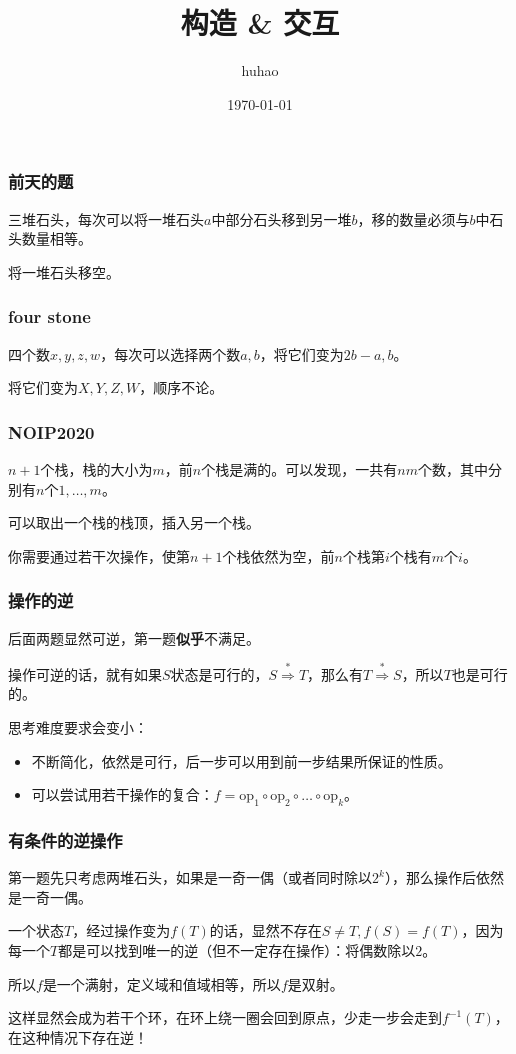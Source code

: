 \documentclass[10pt]{beamer}
\begin{document}
	\title{构造 \& 交互}
	\date{\today}
	\author{huhao}
	\maketitle
	\clearpage
	\begin{frame}
		\frametitle{前天的题}
	
		三堆石头，每次可以将一堆石头$a$中部分石头移到另一堆$b$，移的数量必须与$b$中石头数量相等。

		将一堆石头移空。
	
	\end{frame}
	\clearpage
	\begin{frame}
		\frametitle{four stone}
	
		四个数$x,y,z,w$，每次可以选择两个数$a,b$，将它们变为$2b-a,b$。

		将它们变为$X,Y,Z,W$，顺序不论。
	
	\end{frame}
	\clearpage
	\begin{frame}
		\frametitle{NOIP2020}
	
		$n+1$个栈，栈的大小为$m$，前$n$个栈是满的。可以发现，一共有$nm$个数，其中分别有$n$个$1,\dots,m$。

		可以取出一个栈的栈顶，插入另一个栈。

		你需要通过若干次操作，使第$n+1$个栈依然为空，前$n$个栈第$i$个栈有$m$个$i$。
	
	\end{frame}
	\clearpage
	\begin{frame}
		\frametitle{操作的逆}
	
		后面两题显然可逆，第一题\textbf{似乎}不满足。

		操作可逆的话，就有如果$S$状态是可行的，$S\stackrel*\Rightarrow T$，那么有$T\stackrel*\Rightarrow S$，所以$T$也是可行的。


		思考难度要求会变小：
		
		\begin{itemize}
			\item 不断简化，依然是可行，后一步可以用到前一步结果所保证的性质。
			\item 可以尝试用若干操作的复合：$f=\mathrm{op}_1 \circ \mathrm{op}_2 \circ \dots \circ  \mathrm{op}_k$。
		\end{itemize}
	\end{frame}
	\clearpage
	\begin{frame}
		\frametitle{有条件的逆操作}
	
		第一题先只考虑两堆石头，如果是一奇一偶（或者同时除以$2^k$），那么操作后依然是一奇一偶。

		一个状态$T$，经过操作变为$f(T)$的话，显然不存在$S\not=T,f(S)=f(T)$，因为每一个$T$都是可以找到唯一的逆（但不一定存在操作）：将偶数除以$2$。

		所以$f$是一个满射，定义域和值域相等，所以$f$是双射。

		这样显然会成为若干个环，在环上绕一圈会回到原点，少走一步会走到$f^{-1}(T)$，在这种情况下存在逆！
	
	\end{frame}
\end{document}
